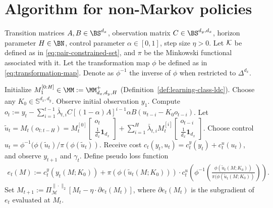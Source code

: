 \section{Algorithm for non-Markov policies}
\begin{algorithm}[H]
\caption{$\NMGPCPOS$}
\label{alg:gpc-po-nonmarkov}
\begin{algorithmic}[1]
\REQUIRE Transition matrices $A,B \in \BS^{d_x}$, observation matrix $C \in \BS^{d_y,d_x}$, horizon parameter $H \in \BN$, control parameter $\alpha\in[0,1]$, step size $\eta>0$.  Let $\mathcal{K}$ be defined as in \cref{eq:pair-constrained-set}, and $\pi$ be the Minkowski functional associated with it. Let the transformation map $\phi$ be defined as in \cref{eq:transformation-map}. Denote as $\phi^{-1}$ the inverse of $\phi$ when restricted to $\Delta^{d_x}$.

\STATE Initialize $M_1^{[0:H]}\in \MM := \MM_{d_x,d_y,H}^{+}$ (Definition~\ref{def:learning-class-ldc}). Choose any $K_0\in\mathbb{S}^{d_x,d_y}$. \label{line:nonmarkovchoose-k0}
\STATE Observe initial observation $y_1$.
    \STATE Compute $o_t := y_t-\sum_{i=1}^{t-1}\bar{\lambda}_{t,i}C[(1-\alpha)A]^{i-1}\alpha B(u_{t-i}-K_0 o_{t-i})$. \label{line:nonmarkovcompute-signal}
    \STATE Let $\tilde{u}_t=M_t(o_{t:t-H})=M_{t}^{[0]} \begin{bmatrix}
o_t\\
\frac{1}{d_x}\mathbf{1}_{d_x}
\end{bmatrix}+\sum_{i=1}^H \bar{\lambda}_{t,i}M_{t}^{[i]} \begin{bmatrix}
o_{t-i}\\
\frac{1}{d_x}\mathbf{1}_{d_x}
\end{bmatrix}$.
    \STATE Choose control $u_t=\phi^{-1}(\phi(\tilde{u}_t)/\pi(\phi(\tilde{u}_t))$.\label{line:nonmarkovcontrol-po}
    \STATE Receive cost $c_t(y_t,u_t)=c_t^y(y_t)+c_t^u(u_t)$, and observe $y_{t+1}$ and $\gamma_t$.
    \STATE Define pseudo loss function 
\begin{align*}
e_t(M) := c_t^y(y_t(M; K_0))+ \pi(\phi(\tilde{u}_t(M;K_0))) \cdot c_t^u(\phi^{-1}(\frac{\phi(\tilde{u}_t(M;K_0))}{\pi(\phi(\tilde{u}_t(M;K_0))})).
\end{align*} \label{line:nonmarkovet-loss}
    \STATE Set $M_{t+1} := \Pi_{\mathcal{M}}^{\|\cdot\|_2}\left[M_t-\eta \cdot \partial e_t(M_t)\right]$, where $\partial e_t(M_t)$ is the subgradient of $e_t$ evaluated at $M_t$. \label{line:nonmarkovpo-update}
\ENDFOR
\end{algorithmic}
\end{algorithm}

